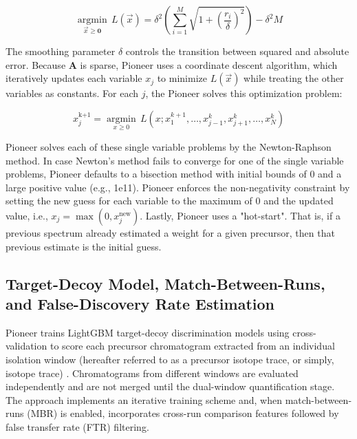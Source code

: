 \documentclass[pdflatex,sn-nature]{sn-jnl}
\begin{document}
\begin{equation}
\underset{\vec{x} \geq  \mathbf{0}}{\operatorname{argmin}}\,  L(\vec{x}) = \delta^2\left(\sum\limits_{i=1}^{M}\sqrt{
1 + \left(\frac{r_{i}}{\delta}\right)^{2}
}\right) - \delta^{2}M
\end{equation}

The smoothing parameter $\delta$ controls the transition between squared and absolute error. Because $\mathbf{A}$ is sparse, Pioneer uses a coordinate descent algorithm, which iteratively updates each variable $x_j$ to minimize $L(\vec{x})$ while treating the other variables as constants. For each $j$, the Pioneer solves this optimization problem:

\begin{equation}
x_j^{\text{k+1}} = \underset{x \geq 0}{\operatorname{argmin}} \, L(x; x_{1}^{k+1},\dots,x_{j-1}^{k},x_{j+1}^{k}, \dots, x_{N}^{k})
\end{equation}

Pioneer solves each of these single variable problems by the Newton-Raphson method. In case Newton's method fails to converge for one of the single variable problems, Pioneer defaults to a bisection method with initial bounds of 0 and a large positive value (e.g., 1e11).  Pioneer enforces the non-negativity constraint by setting the new guess for each variable to the maximum of 0 and the updated value, i.e., $x_j = \max(0, x_j^{\text{new}})$. Lastly, Pioneer uses a "hot-start". That is, if a previous spectrum already estimated a weight for a given precursor, then that previous estimate is the initial guess.

\subsection{Target-Decoy Model, Match-Between-Runs, and False-Discovery Rate Estimation}\label{subsec:target-decoy-mbr-fdr}

Pioneer trains LightGBM target-decoy discrimination models using cross-validation to score each precursor chromatogram extracted from an individual isolation window (hereafter referred to as a precursor isotope trace, or simply, isotope trace) \cite{ke2017lightgbm}. Chromatograms from different windows are evaluated independently and are not merged until the dual-window quantification stage. The approach implements an iterative training scheme and, when match-between-runs (MBR) is enabled, incorporates cross-run comparison features followed by false transfer rate (FTR) filtering.
\end{document}

